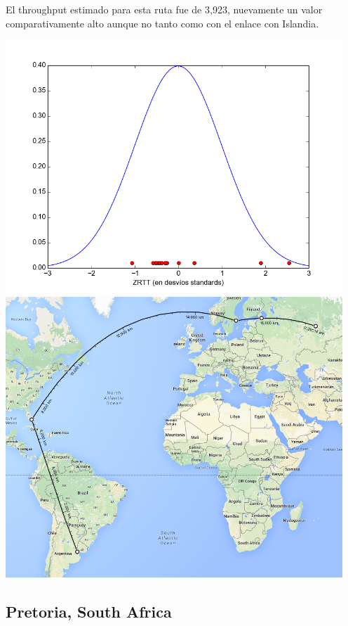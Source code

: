 El throughput estimado para esta ruta fue de 3,923, nuevamente un valor comparativamente alto aunque no tanto como con el enlace con Islandia.

\includegraphics[width=5in]{imgs/perm_dist.png}
\includegraphics[width=5in]{imgs/maps/perm.png}

\subsection{Pretoria, South Africa}

